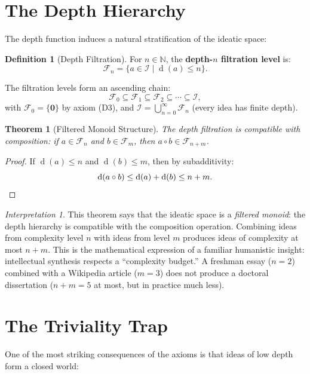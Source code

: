 \documentclass[11pt,openany]{book}
\theoremstyle{definition}
\newtheorem{definition}[axiom]{Definition}
\theoremstyle{plain}
\newtheorem{theorem}[axiom]{Theorem}
\theoremstyle{remark}
\newtheorem{interpretation}[axiom]{Interpretation}
\newcommand{\IS}{\mathcal{I}}               %
\newcommand{\compose}{\circ}                 %
\newcommand{\void}{\mathbf{0}}              %
\newcommand{\depth}{\operatorname{d}}       %
\newcommand{\Filt}[1]{\mathcal{F}_{#1}}     %
\begin{document}
\section{The Depth Hierarchy}

The depth function induces a natural stratification of the ideatic space:

\begin{definition}[Depth Filtration]
\label{def:filtration}
For $n \in \mathbb{N}$, the \textbf{depth-$n$ filtration level} is:
\[
\Filt{n} = \{ a \in \IS \mid \depth(a) \leq n \}.
\]
\end{definition}

The filtration levels form an ascending chain:
\[
\Filt{0} \subseteq \Filt{1} \subseteq \Filt{2} \subseteq \cdots \subseteq \IS,
\]
with $\Filt{0} = \{\void\}$ by axiom (D3), and $\IS = \bigcup_{n=0}^{\infty} \Filt{n}$ (every idea has finite depth).

\begin{theorem}[Filtered Monoid Structure]
\label{thm:filtered-monoid}
The depth filtration is compatible with composition: if $a \in \Filt{n}$ and $b \in \Filt{m}$, then $a \compose b \in \Filt{n+m}$.
\end{theorem}

\begin{proof}
If $\depth(a) \leq n$ and $\depth(b) \leq m$, then by subadditivity:
\[
\depth(a \compose b) \leq \depth(a) + \depth(b) \leq n + m. \qedhere
\]
\end{proof}

\begin{interpretation}
This theorem says that the ideatic space is a \emph{filtered monoid}: the depth hierarchy is compatible with the composition operation. Combining ideas from complexity level $n$ with ideas from level $m$ produces ideas of complexity at most $n + m$. This is the mathematical expression of a familiar humanistic insight: intellectual synthesis respects a ``complexity budget.'' A freshman essay ($n = 2$) combined with a Wikipedia article ($m = 3$) does not produce a doctoral dissertation ($n + m = 5$ at most, but in practice much less).
\end{interpretation}

\section{The Triviality Trap}

One of the most striking consequences of the axioms is that ideas of low depth form a closed world:
\end{document}
